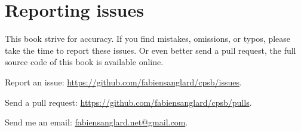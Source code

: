 \chapter{Reporting issues}
This book strive for accuracy. If you find mistakes, omissions, or typos, please take the time to report these issues. Or even better send a pull request, the full source code of this book is available online.


Report an issue: \href{https://github.com/fabiensanglard/cpsb/issues}{https://github.com/fabiensanglard/cpsb/issues}.

Send a pull request: \href{https://github.com/fabiensanglard/cpsb/pulls}{https://github.com/fabiensanglard/cpsb/pulls}.

Send me an email: \href{mailto:fabiensanglard.net@gmail.com}{fabiensanglard.net@gmail.com}.
